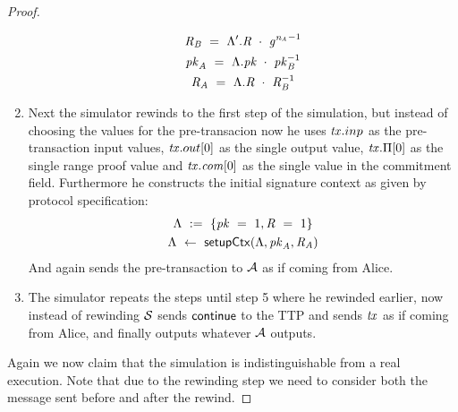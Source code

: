 \begin{proof}
\begin{enumerate}
\begin{gather*}
            \mathit{R}_{\mathit{B}} ~=~ {\Lambda}'.\mathit{R} ~\cdot~ {\mathit{g}^{\mathit{\mathit{n}_{\mathit{A}}}}}^{-1} \\
            \mathit{pk}_{\mathit{A}} ~=~ \Lambda.\mathit{pk} ~\cdot~ \mathit{pk}_{\mathit{B}}^{-1} \\
            \mathit{R}_{\mathit{A}} ~=~ \Lambda.\mathit{R} ~\cdot~ \mathit{R}_{\mathit{B}}^{-1}
        \end{gather*}
        \item Next the simulator rewinds to the first step of the simulation, but instead of choosing the values for the pre-transacion now he uses $\mathit{tx}.inp$ as the pre-transaction input values, $\mathit{tx}.out[0]$ as the single output value, $\mathit{tx}.\Pi[0]$ as the single range proof value and $\mathit{tx}.\mathit{com}[0]$ as the single value in the commitment field.
        Furthermore he constructs the initial signature context as given by protocol specification:
        \begin{gather*}
            \Lambda ~:=~ \{ \mathit{pk} ~=~ 1, \mathit{R} ~=~ 1 \} \\
            \Lambda ~\leftarrow~ \mathsf{setupCtx}( \Lambda, \mathit{pk}_{\mathit{A}}, \mathit{R}_{\mathit{A}} )
        \end{gather*}
        And again sends the pre-transaction to $\mathcal{A}$ as if coming from Alice.
        \item The simulator repeats the steps until step 5 where he rewinded earlier, now instead of rewinding $\mathcal{S}$ sends $\mathsf{continue}$ to the TTP and sends $\mathit{tx}$ as if coming from Alice, and finally outputs whatever $\mathcal{A}$ outputs.
    \end{enumerate}

    Again we now claim that the simulation is indistinguishable from a real execution.
    Note that due to the rewinding step we need to consider both the message sent before and after the rewind.


\end{proof}
